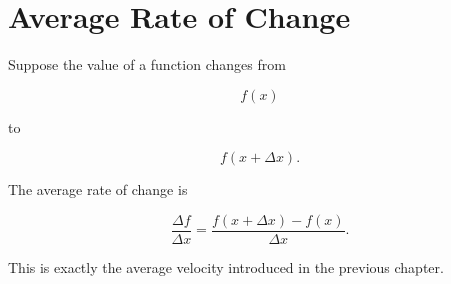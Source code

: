 \section{Average Rate of Change}

Suppose the value of a function changes from

\[
f(x)
\]

to

\[
f(x+\Delta x).
\]

The average rate of change is

\[
\boxed{
	\frac{\Delta f}{\Delta x}
	=
	\frac{f(x+\Delta x)-f(x)}
	{\Delta x}.
}
\]

This is exactly the average velocity introduced in the previous chapter.

